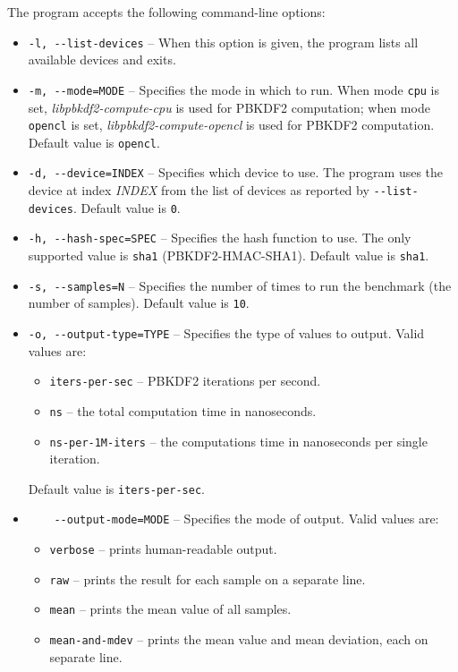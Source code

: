 \documentclass[12pt,oneside]{fithesis2}
\begin{document}
      The program accepts the following command-line options:
      \begin{itemize}
        \item \verb|-l, --list-devices| -- When this option is given, the program lists all available devices and exits.
        \item \verb|-m, --mode=MODE| -- Specifies the mode in which to run. When mode \verb|cpu| is set, \emph{libpbkdf2-compute-cpu} is used for PBKDF2 computation; when mode \verb|opencl| is set, \emph{libpbkdf2-compute-opencl} is used for PBKDF2 computation. Default value is \verb|opencl|.
        \item \verb|-d, --device=INDEX| -- Specifies which device to use. The program uses the device at index \emph{INDEX} from the list of devices as reported by \verb|--list-devices|. Default value is \verb|0|.
        \item \verb|-h, --hash-spec=SPEC| -- Specifies the hash function to use. The only supported value is \verb|sha1| (PBKDF2-HMAC-SHA1). Default value is \verb|sha1|.
        \item \verb|-s, --samples=N| -- Specifies the number of times to run the benchmark (the number of samples). Default value is \verb|10|.
        \item \verb|-o, --output-type=TYPE| -- Specifies the type of values to output. Valid values are:
        \begin{itemize}
          \item \verb|iters-per-sec| -- PBKDF2 iterations per second.
          \item \verb|ns| -- the total computation time in nanoseconds.
          \item \verb|ns-per-1M-iters| -- the computations time in nanoseconds per single iteration.
        \end{itemize}
        Default value is \verb|iters-per-sec|.
        \item \verb|    --output-mode=MODE| -- Specifies the mode of output. Valid values are:
        \begin{itemize}
          \item \verb|verbose| -- prints human-readable output.
          \item \verb|raw| -- prints the result for each sample on a separate line.
          \item \verb|mean| -- prints the mean value of all samples.
          \item \verb|mean-and-mdev| -- prints the mean value and mean deviation, each on separate line.

\end{itemize}
\end{itemize}
\end{document}
